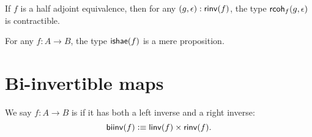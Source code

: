 \documentclass[hott-all.tex]{subfiles}
\begin{document}
\begin{lem}\label{lem:coh-hprop}
  If $f$ is a half adjoint equivalence, then for any $(g,\epsilon) : \mathsf{rinv}(f)$, the type $\mathsf{rcoh}_{f}(g,\epsilon)$ is contractible.
\end{lem}

\begin{thm}\label{thm:hae-hprop}
  For any $f : A \to B$, the type $\mathsf{ishae}(f)$ is a mere proposition.
\end{thm}
%
%

\section{Bi-invertible maps}
\label{sec:biinv}
%
%

\begin{defn}\label{defn:biinv}
  We say $f:A\to B$ is 
  if it has both a left inverse and a right inverse:
  \[ \mathsf{biinv} (f) \vcentcolon\equiv \mathsf{linv}(f) \times \mathsf{rinv}(f). \]
\end{defn}
%
\end{document}
